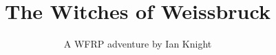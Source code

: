 \documentclass{wfrp}
\begin{document}
\title{The Witches of Weissbruck}
\author{A WFRP adventure by Ian Knight}
\date{}
\maketitle

\tableofcontents



\end{document}
